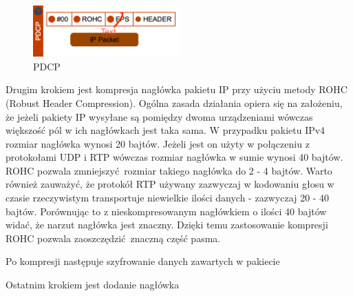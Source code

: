 \begin{figure}
	\centering
		\includegraphics[width=0.5\textwidth]{pdcp.png}
	\caption{PDCP}
\end{figure}

Drugim krokiem jest kompresja nagłówka pakietu IP przy użyciu metody ROHC (Robust Header Compression). Ogólna zasada działania opiera się na założeniu, że jeżeli pakiety IP wysyłane są pomiędzy dwoma urządzeniami wówczas większość pól w ich nagłówkach jest taka sama. W przypadku pakietu IPv4 rozmiar nagłówka wynosi 20 bajtów. Jeżeli jest on użyty w połączeniu z protokołami UDP i RTP wówczas rozmiar nagłówka w sumie wynosi 40 bajtów. ROHC pozwala zmniejszyć rozmiar takiego nagłówka do 2 - 4 bajtów. Warto również zauważyć, że protokół RTP używany zazwyczaj w kodowaniu głosu w czasie rzeczywistym transportuje niewielkie ilości danych - zazwyczaj 20 - 40 bajtów. Porównując to z nieskompresowanym nagłówkiem o ilości 40 bajtów widać, że narzut nagłówka jest znaczny. Dzięki temu zastosowanie kompresji ROHC pozwala zaoszczędzić znaczną część pasma.

Po kompresji następuje szyfrowanie danych zawartych w pakiecie

Ostatnim krokiem jest dodanie nagłówka 